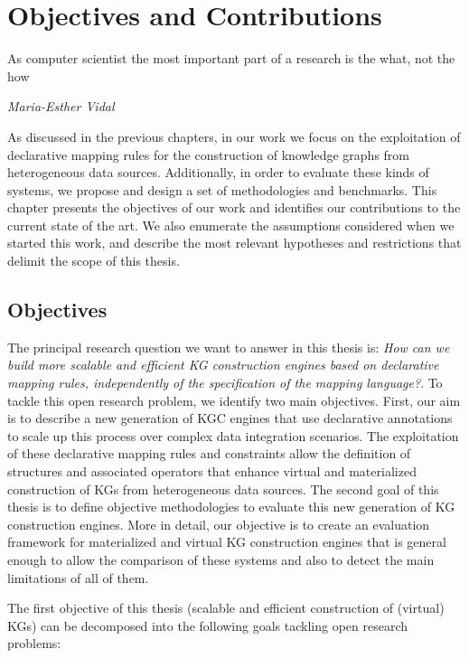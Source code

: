 \chapter{Objectives and Contributions}

\epigraph{As computer scientist the most important part of a research is the what, not the how}{\textit{Maria-Esther Vidal}}

\label{chap:objectives}
As discussed in the previous chapters, in our work we focus on the exploitation of declarative mapping rules for the construction of knowledge graphs from heterogeneous data sources. Additionally, in order to evaluate these kinds of systems, we propose and design a set of methodologies and benchmarks. This chapter presents the objectives of our work and identifies our contributions to the current state of the art. We also enumerate the assumptions considered when we started this work, and describe the most relevant hypotheses and restrictions that delimit the scope of this thesis.

\section{Objectives}
The principal research question we want to answer in this thesis is: \textit{How can we build more scalable and efficient KG construction engines based on declarative mapping rules, independently of the specification of the mapping language?}. To tackle this open research problem, we identify two main objectives. 
First, our aim is to describe a new generation of KGC engines that use declarative annotations to scale up this process over complex data integration scenarios. The exploitation of these declarative mapping rules and constraints allow the definition of structures and associated operators that enhance virtual and materialized construction of KGs from heterogeneous data sources. The second goal of this thesis is to define objective methodologies to evaluate this new generation of KG construction engines. More in detail, our objective is to create an evaluation framework for materialized and virtual KG construction engines that is general enough to allow the comparison of these systems and also to detect the main limitations of all of them.

The first objective of this thesis (scalable and efficient construction of (virtual) KGs) can be decomposed into the following goals tackling open research problems:

